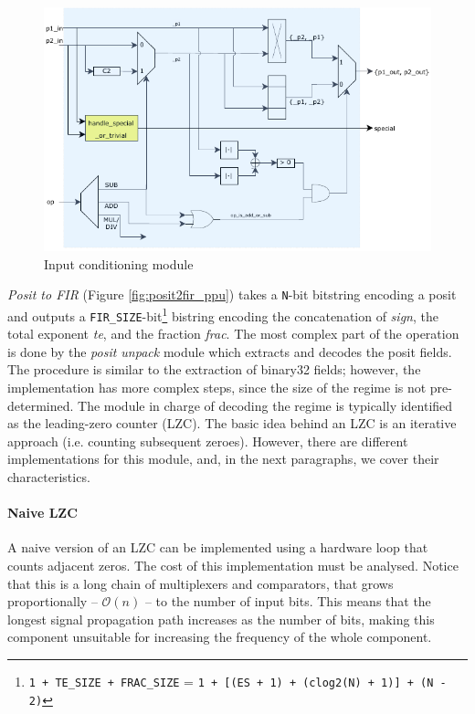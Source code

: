 \begin{figure}
    \centering
    \includegraphics[width=.75\textwidth]{figures/input_conditioning.pdf}
    \caption{Input conditioning module}
    \label{fig:input_conditioning_module}
\end{figure}
\textit{Posit to FIR} (Figure \ref{fig:posit2fir_ppu}) takes a \texttt{N}-bit bitstring encoding a posit and outputs a \texttt{FIR\_SIZE}-bit\footnote{\texttt{1 + TE\_SIZE + FRAC\_SIZE} = \texttt{1 + [(ES + 1) + (clog2(N) + 1)] + (N - 2)}} bistring encoding the concatenation of \textit{sign}, the total exponent \textit{te}, and the fraction \textit{frac}.
The most complex part of the operation is done by the \textit{posit unpack} module which extracts and decodes the posit fields. The procedure is similar to the extraction of binary32 fields; however, the implementation has more complex steps, since the size of the regime is not pre-determined.
The module in charge of decoding the regime is typically identified as the leading-zero counter (LZC). The basic idea behind an LZC is an iterative approach (i.e. counting subsequent zeroes). However, there are different implementations for this module, and, in the next paragraphs, we cover their characteristics.

\paragraph{Naive LZC}
A naive version of an LZC can be implemented using a hardware loop that counts adjacent zeros. The cost of this implementation must be analysed.
Notice that this is a long chain of multiplexers and comparators, that grows proportionally -- $\mathcal{O}(n)$ -- to the number of input bits. This means that the longest signal propagation path increases as the number of bits, making this component unsuitable for increasing the frequency of the whole component.

